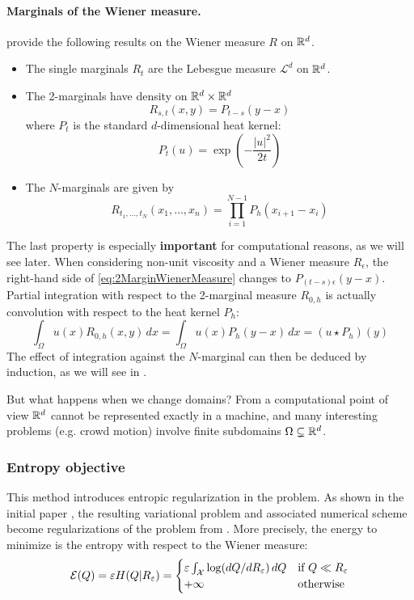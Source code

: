 \documentclass[../report.tex]{subfiles}
\begin{document}
\paragraph{Marginals of the Wiener measure.} \textcite{benamou2018entropy} provide the following results on the Wiener measure $R$ on $\mathbb{R}^d$.
\begin{itemize}
	\item The single marginals $R_t$ are the Lebesgue measure $\mathcal{L}^d$ on $\mathbb{R}^d$.
	\item The 2-marginals have density on $\mathbb{R}^d \times \mathbb{R}^d$
	\begin{equation}\label{eq:2MarginWienerMeasure}
		R_{s,t}(x,y) = P_{t-s}(y-x)
	\end{equation}
	where $P_t$ is the standard $d$-dimensional heat kernel:
	\begin{equation}\label{eq:StandardDHeatKernel}
		P_t(u) = \exp\left(
		-\frac{|u|^2}{2t}
		\right)
	\end{equation}
	\item The $N$-marginals are given by
	\begin{equation}
		R_{t_1,\ldots,t_N}(x_1,\ldots,x_n) = 
		\prod_{i=1}^{N-1}
		P_{h}(x_{i+1}-x_i)
	\end{equation}
\end{itemize}
The last property is especially \textbf{important} for computational reasons, as we will see later. When considering non-unit viscosity and a Wiener measure $R_\epsilon$, the right-hand side of \eqref{eq:2MarginWienerMeasure} changes to $P_{(t-s)\epsilon}(y-x)$. Partial integration with respect to the 2-marginal measure $R_{0,h}$ is actually convolution with respect to the heat kernel $P_h$:
\[
	\int_\Omega u(x) R_{0,h}(x,y)\,dx =
	\int_\Omega u(x) P_h(y-x)\,dx =
	(u \star P_h)(y)
\]
The effect of integration against the $N$-marginal can then be deduced by induction, as we will see in .


But what happens when we change domains? From a computational point of view $\mathbb{R}^d$ cannot be represented exactly in a machine, and many interesting problems (e.g. crowd motion) involve finite subdomains $\Omega \subsetneq \mathbb{R}^d$.


\subsubsection{Entropy objective}

This method introduces entropic regularization in the problem. As shown in the initial paper \cite{benamou2018entropy}, the resulting variational problem and associated numerical scheme become regularizations of the problem from \cite{benamou:hal-01295299,benamou2015lagrangian}.
More precisely, the energy to minimize is the entropy with respect to the Wiener measure:
\begin{equation}
	\mathcal{E}(Q) = \varepsilon H(Q | R_\varepsilon) =
	\begin{cases}
	\varepsilon \int_{\mathcal{X}} \log(dQ/dR_\varepsilon)\, dQ
	& \mbox{if } Q \ll R_\varepsilon  \\
	+\infty & \mbox{otherwise}
	\end{cases}
\end{equation}
\end{document}
